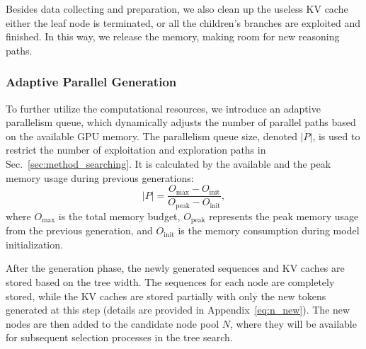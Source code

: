 Besides data collecting and preparation, we also clean up the useless KV cache either the leaf node is terminated, or all the children's branches are exploited and finished. In this way, we release the memory, making room for new reasoning paths. 

\subsubsection{Adaptive Parallel Generation}
To further utilize the computational resources, we introduce an adaptive parallelism queue, which dynamically adjusts the number of parallel paths based on the available GPU memory. The parallelism queue size, denoted \( |P| \), is used to restrict the number of exploitation and exploration paths in Sec.~\ref{sec:method_searching}. It is calculated by the available and the peak memory usage during previous generations: 
\begin{equation}
\label{eq:queue_size}
|P| = \frac{O_{\text{max}} - O_{\text{init}}}{O_{\text{peak}} - O_{\text{init}}},
\end{equation}
where $O_{\text{max}}$ is the total memory budget, \( O_{\text{peak}} \) represents the peak memory usage from the previous generation, and \( O_{\text{init}} \) is the memory consumption during model initialization. 
 

After the generation phase, the newly generated sequences and KV caches are stored based on the tree width. The sequences for each node are completely stored, while the KV caches are stored partially with only the new tokens generated at this step (details are provided in Appendix~\ref{eq:n_new}). 
The new nodes are then added to the candidate node pool \( N \), where they will be available for subsequent selection processes in the tree search.

\vspace{0.05in}

